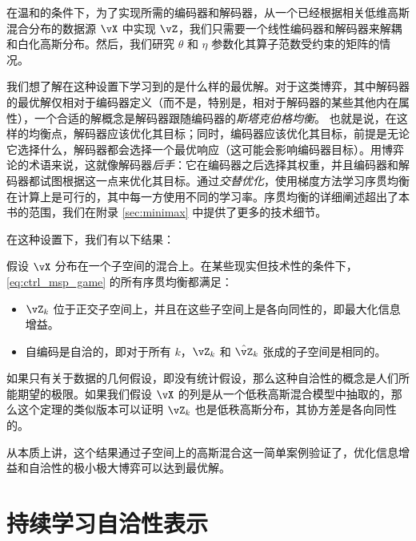 \documentclass[../../book-main_zh.tex]{subfiles}
\begin{document}
在温和的条件下，为了实现所需的编码器和解码器，从一个已经根据相关低维高斯混合分布的数据源 \(\vX\) 中实现 \(\vZ\)，我们只需要一个线性编码器和解码器来解耦和白化高斯分布。然后，我们研究 \(\theta\) 和 \(\eta\) 参数化其算子范数受约束的矩阵的情况。

我们想了解在这种设置下学习到的是什么样的最优解。对于这类博弈，其中解码器的最优解仅相对于编码器定义（而不是，特别是，相对于解码器的某些其他内在属性），一个合适的解概念是解码器跟随编码器的\textit{斯塔克伯格均衡}。%
也就是说，在这样的均衡点，解码器应该优化其目标；同时，编码器应该优化其目标，前提是无论它选择什么，解码器都会选择一个最优响应（这可能会影响编码器目标）。用博弈论的术语来说，这就像解码器\textit{后手}：它在编码器之后选择其权重，并且编码器和解码器都试图根据这一点来优化其目标。通过\textit{交替优化}，使用梯度方法学习序贯均衡在计算上是可行的，其中每一方使用不同的学习率。序贯均衡的详细阐述超出了本书的范围，我们在附录 \ref{sec:minimax} 中提供了更多的技术细节。

在这种设置下，我们有以下结果：
\begin{theorem}\label{thm:ctrl_theory}
    假设 \(\vX\) 分布在一个子空间的混合上。在某些现实但技术性的条件下，\eqref{eq:ctrl_msp_game} 的所有序贯均衡都满足：
    \begin{itemize}
        \item \(\vZ_{k}\) 位于正交子空间上，并且在这些子空间上是各向同性的，即最大化信息增益。
        \item 自编码是自洽的，即对于所有 \(k\)，\(\vZ_{k}\) 和 \(\hat{\vZ}_{k}\) 张成的子空间是相同的。
    \end{itemize}
\end{theorem}
如果只有关于数据的几何假设，即没有统计假设，那么这种自洽性的概念是人们所能期望的极限。如果我们假设 \(\vX\) 的列是从一个低秩高斯混合模型中抽取的，那么这个定理的类似版本可以证明 \(\vZ_{k}\) 也是低秩高斯分布，其协方差是各向同性的。%

从本质上讲，这个结果通过子空间上的高斯混合这一简单案例验证了，优化信息增益和自洽性的极小极大博弈可以达到最优解。






\section{持续学习自洽性表示}
\label{sec:continuous}
\end{document}
